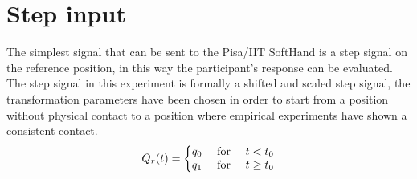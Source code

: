 \newpage
\section{Step input}
The simplest signal that can be sent to the Pisa/IIT SoftHand is a step signal on the reference position, in this way the participant's response can be evaluated. The step signal in this experiment is formally a shifted and scaled step signal, the transformation parameters have been chosen in order to start from a position without physical contact to a position where empirical experiments have shown a consistent contact. 
\begin{equation}
Q_{r}(t)=\left\{\begin{matrix}
q_{0} & $ for $ & t < t_0 \\ 
q_{1} & $ for $ & t \geq t_0
\end{matrix}\right.
\label{EQ:StepSignal}
\end{equation}

